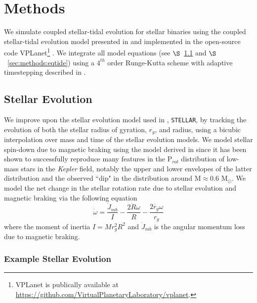 \documentclass[twocolumn]{aastex61}
\newcommand{\stellar}[0]{\texttt{STELLAR}\xspace}
\begin{document}

\section{Methods} \label{sec:methods}

We simulate coupled stellar-tidal evolution for stellar binaries using the coupled stellar-tidal evolution model presented in \citet{Fleming2018} and implemented in the open-source code VPLanet\footnote{VPLanet is publically available
at \href{https://github.com/VirtualPlanetaryLaboratory/vplanet}{{https://github.com/VirtualPlanetaryLaboratory/vplanet}}.} \citep[][Barnes et al., in prep]{Barnes2016,vplanet2018}.  We integrate all model equations (see $\S$~\ref{sec:methods:stellar} and $\S$~\ref{sec:methods:eqtide}) using a $4^{th}$ order Runge-Kutta scheme with adaptive timestepping described in \citet{Fleming2018}.  

\subsection{Stellar Evolution} \label{sec:methods:stellar}

We improve upon the stellar evolution model used in \citet{Fleming2018}, \stellar, by tracking the evolution of both the stellar radius of gyration, $r_g$, and radius, using a bicubic interpolation over mass and time of the \citet{Baraffe2015} stellar evolution models. We model stellar spin-down due to magnetic braking using the model derived in \citet{Matt2015} since it has been shown to successfully reproduce many features in the P$_{rot}$ distribution of low-mass stars in the \textit{Kepler} field, notably the upper and lower envelopes of the latter distribution and the observed ``dip" in the distribution around M${\approx}0.6$ M$_{\odot}$. We model the net change in the stellar rotation rate due to stellar evolution and magnetic braking via the following equation 
\begin{equation} \label{eqn:stellar_rot_rate_dt}
\dot{\omega} = \frac{\dot{J}_{mb}}{I} - \frac{2 \dot{R} \omega}{R} - \frac{2 \dot{r_g} \omega}{r_g}
\end{equation}
where the moment of inertia $I = M r_g^2 R^2$ and $\dot{J}_{mb}$ is the angular momentum loss due to magnetic braking.  

\subsubsection{Example Stellar Evolution} \label{sec:methods:stellarExample}
\end{document}
